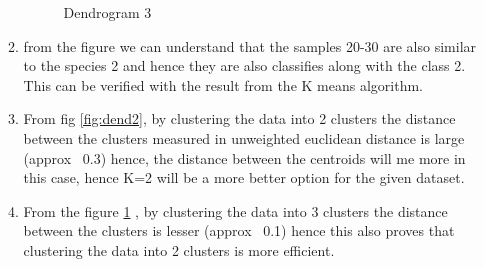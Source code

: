 \documentclass[10pt, letterpaper]{article}
\begin{document}
\begin{enumerate}
\begin{enumerate}
\begin{figure}[h!]
	\caption{Dendrogram 3}
	\label{fig:dend3}
	\end{figure}
\item from the figure we can understand that the samples 20-30 are also similar to the species 2 and hence they are also classifies along with the class 2. This can be verified with the result from the K means algorithm.
\item From fig \ref{fig:dend2}, by clustering the data into 2 clusters the distance between the clusters measured in unweighted euclidean distance is large (approx ~0.3) hence, the distance between the centroids will me more in this case, hence K=2 will be a more better option for the given dataset.

\item From the figure \ref{fig:dend3} , by clustering the data into 3 clusters the distance between the clusters is lesser (approx ~0.1) hence this also proves that clustering the data into 2 clusters is more efficient. 
\end{enumerate}
\newpage
	

\end{enumerate}
\end{document}
